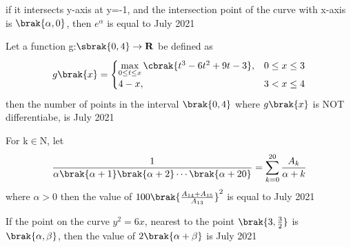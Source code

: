 if it intersects y-axis at y=-1, and the intersection point of the curve with x-axis is $\brak{\alpha,0}$, then $e^{\alpha}$ is equal to \hfill{July 2021}
\item Let a function g:$\sbrak{0,4}\rightarrow \mathbf{R}$ be defined as 
\begin{align*}
    g\brak{x}=
    \begin{cases}
     \max\limits_{\substack{0 \leq t \leq x}} \cbrak{t^3-6t^2+9t-3}, & 0\leq x \leq 3\\
     4-x, & 3 < x\leq 4
    \end{cases}
\end{align*}
then the number of points in the interval $\brak{0,4}$ where $g\brak{x}$ is NOT differentiabe, is  \hfill{July 2021}
\item For k$\in$N, let
\begin{align*}
    \frac{1}{\alpha \brak{\alpha+1} \brak{\alpha+2}\cdots\brak{\alpha+20}}=\sum_{k=0}^{20} \frac{A_k}{\alpha+k}
\end{align*}
where $\alpha>0$ then the value of $100\brak{\frac{A_{14}+A_{15}}{A_{13}}}^2$ is equal to \hfill{July 2021}
\item If the point on the curve $y^2=6x$, nearest to the point $\brak{3,\frac{3}{2}}$ is $\brak{\alpha,\beta}$, then the value of $2\brak{\alpha+\beta}$ is \hfill{July 2021}
   
